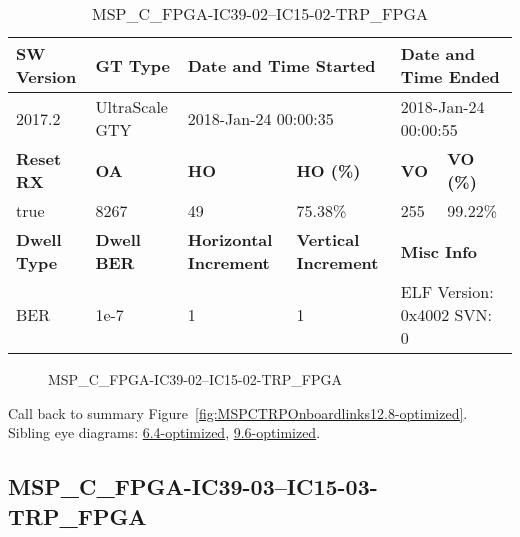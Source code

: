 \begin{table}[h]
\centering
\caption{MSP\_C\_FPGA-IC39-02--IC15-02-TRP\_FPGA}
\label{tab:MSPCFPGAIC3902IC1502TRPFPGA12.8-optimized}
\begin{tabular}{@{}|l|l|l|l|l|l|@{}}
\toprule
\textbf{SW Version}                & \textbf{GT Type}   & \multicolumn{2}{l|}{\textbf{Date and Time Started}}            & \multicolumn{2}{l|}{\textbf{Date and Time Ended}}        \\ \midrule
2017.2                       & UltraScale GTY          & \multicolumn{2}{l|}{2018-Jan-24 00:00:35}                   & \multicolumn{2}{l|}{2018-Jan-24 00:00:55}               \\ \midrule
\textbf{Reset RX}                  & \textbf{OA} & \textbf{HO}   & \textbf{HO (\%)} & \textbf{VO} & \textbf{VO (\%)} \\ \midrule
true & 8267        & 49          & 75.38\%        & 255        & 99.22\%       \\ \midrule
\textbf{Dwell Type}                & \textbf{Dwell BER} & \textbf{Horizontal Increment} & \textbf{Vertical Increment}    & \multicolumn{2}{l|}{\textbf{Misc Info}}                  \\ \midrule
BER                            & 1e-7        & 1        & 1           & \multicolumn{2}{l|}{ELF Version: 0x4002 SVN: 0}                         \\ \bottomrule
\end{tabular}
\end{table}

\begin{figure}[h]
\caption{MSP\_C\_FPGA-IC39-02--IC15-02-TRP\_FPGA} \label{fig:MSPCFPGAIC3902IC1502TRPFPGA12.8-optimized}
\end{figure}

Call back to summary Figure~\ref{fig:MSPCTRPOnboardlinks12.8-optimized}.
Sibling eye diagrams: \hyperref[sec:MSPCFPGAIC3902IC1502TRPFPGA6.4-optimized]{6.4-optimized}, \hyperref[sec:MSPCFPGAIC3902IC1502TRPFPGA9.6-optimized]{9.6-optimized}.

\clearpage
\newpage


\subsection{MSP\_C\_FPGA-IC39-03--IC15-03-TRP\_FPGA}\label{sec:MSPCFPGAIC3903IC1503TRPFPGA12.8-optimized}

